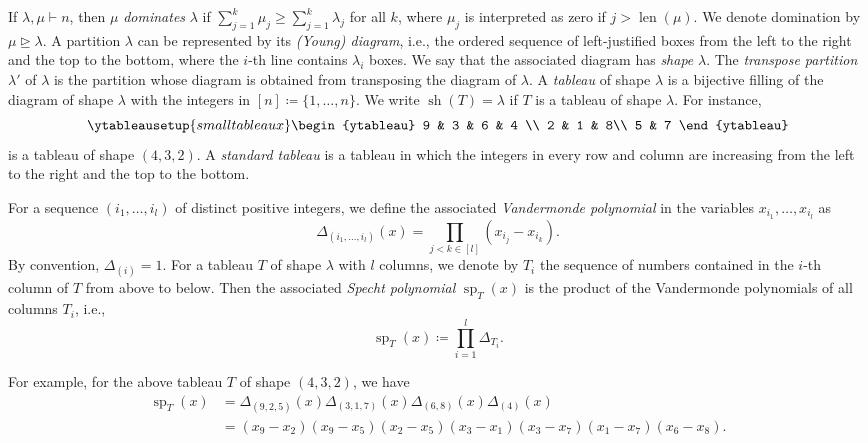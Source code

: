 \documentclass[11pt]{amsart}
\theoremstyle{definition}
\DeclareMathOperator{\sh}{sh}
\DeclareMathOperator{\len}{len}
\DeclareMathOperator{\spe}{sp}
\begin{document}
If $\lambda, \mu \vdash n$, then $\mu$ \emph{dominates} $\lambda$ if $\sum_{j=1}^k \mu_j \geq \sum_{j=1}^k \lambda_j$ for all $k$, where $\mu_j$ is interpreted as zero if $j > \len(\mu)$. We denote domination by $\mu \unrhd \lambda$.
A partition $\lambda$ can be represented by its \emph{(Young) diagram}, i.e., the ordered sequence of left-justified boxes from the left to the right and the top to the bottom, where the $i$-th line contains $\lambda_i$ boxes. We say that the associated diagram has \emph{shape} $\lambda$. The \emph{transpose partition} $\lambda'$ of $\lambda$ is the partition whose diagram is obtained from transposing the diagram of $\lambda$. A \emph{tableau} of shape $\lambda$ is a bijective filling of the diagram of shape $\lambda$ with the integers in $[n] \coloneqq \{1,\ldots,n\}$. We write $\sh(T) = \lambda$ if $T$ is a tableau of shape $\lambda$.
For instance,
$$\ytableausetup{smalltableaux}
\begin{ytableau}
9 & 3 & 6 & 4 \\
2 & 1 & 8\\ 
5 & 7
\end{ytableau}$$
is a tableau of shape $(4,3,2)$.  
A \emph{standard tableau} is a tableau in which the integers in every row and column are increasing from the left to the right and the top to the bottom.

For a sequence $(i_1,\ldots,i_l)$ of distinct positive integers, we define the associated \emph{Vandermonde polynomial} in the variables $x_{i_1},\ldots,x_{i_l}$ as \[ \Delta_{(i_1,\ldots,i_l)}(x) = \prod_{j < k \in  [l]}(x_{i_j}-x_{i_k}). \] By convention, $\Delta_{(i)} = 1$.
For a tableau $T$ of shape $\lambda$ with $l$ columns, we denote by $T_i$ the sequence of numbers contained in the $i$-th column of $T$ from above to below. Then the associated \emph{Specht polynomial} $\spe_T(x)$ is the product of the Vandermonde polynomials of all columns $T_i$, i.e.,
\[ \spe_{T}(x) \coloneqq \prod_{i=1}^l \Delta_{T_i}.\]

For example, for the above tableau $T$ of shape $(4,3,2)$, we have 
\begin{align*}
\spe_{T}(x)&=\Delta_{(9,2,5)}(x)\Delta_{(3,1,7)}(x)\Delta_{(6,8)}(x)\Delta_{(4)}(x) 
\\ &=(x_9-x_2)(x_9-x_5)(x_2-x_5)(x_3-x_1)(x_3-x_7)(x_1-x_7)(x_6-x_8).
\end{align*}
\end{document}
